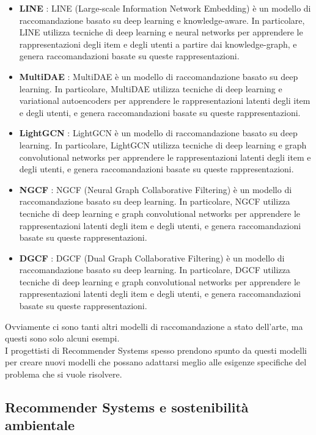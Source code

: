 \begin{itemize}
    \item \textbf{LINE} \cite{LINE}: LINE (Large-scale Information Network Embedding) è un modello di raccomandazione basato su deep learning e knowledge-aware. In particolare, LINE utilizza tecniche di deep learning e neural networks per apprendere le rappresentazioni degli item e degli utenti a partire dai knowledge-graph, e genera raccomandazioni basate su queste rappresentazioni.
    \item \textbf{MultiDAE} \cite{MultiDAE}: MultiDAE è un modello di raccomandazione basato su deep learning. In particolare, MultiDAE utilizza tecniche di deep learning e variational autoencoders per apprendere le rappresentazioni latenti degli item e degli utenti, e genera raccomandazioni basate su queste rappresentazioni.
    \item \textbf{LightGCN} \cite{LightGCN}: LightGCN è un modello di raccomandazione basato su deep learning. In particolare, LightGCN utilizza tecniche di deep learning e graph convolutional networks per apprendere le rappresentazioni latenti degli item e degli utenti, e genera raccomandazioni basate su queste rappresentazioni.
    \item \textbf{NGCF} \cite{NGCF}: NGCF (Neural Graph Collaborative Filtering) è un modello di raccomandazione basato su deep learning. In particolare, NGCF utilizza tecniche di deep learning e graph convolutional networks per apprendere le rappresentazioni latenti degli item e degli utenti, e genera raccomandazioni basate su queste rappresentazioni.
    \item \textbf{DGCF} \cite{DGCF}: DGCF (Dual Graph Collaborative Filtering) è un modello di raccomandazione basato su deep learning. In particolare, DGCF utilizza tecniche di deep learning e graph convolutional networks per apprendere le rappresentazioni latenti degli item e degli utenti, e genera raccomandazioni basate su queste rappresentazioni.
\end{itemize}


\noindent Ovviamente ci sono tanti altri modelli di raccomandazione a stato dell'arte, ma questi sono solo alcuni esempi.\\
I progettisti di Recommender Systems spesso prendono spunto da questi modelli per creare nuovi modelli che possano adattarsi meglio alle esigenze specifiche del problema che si vuole risolvere.\\



\subsection{Recommender Systems e sostenibilità ambientale}

